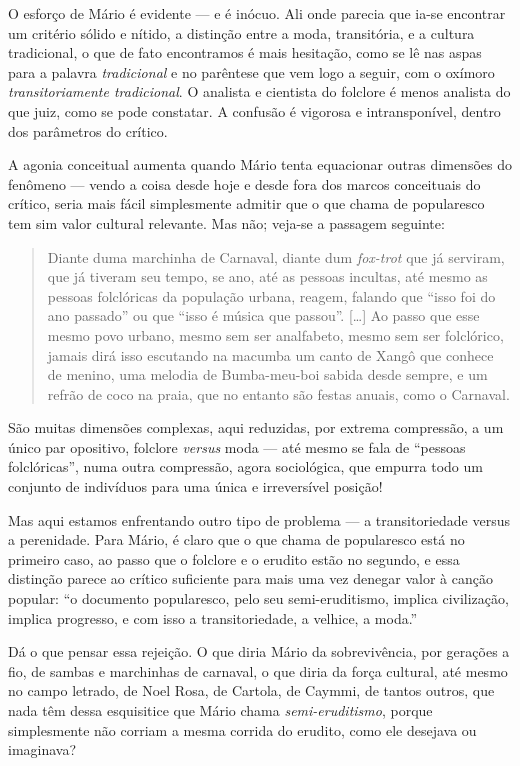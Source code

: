 O esforço de Mário é evidente --- e é inócuo. Ali onde parecia que ia-se
encontrar um critério sólido e nítido, a distinção entre a moda,
transitória, e a cultura tradicional, o que de fato encontramos é mais
hesitação, como se lê nas aspas para a palavra \textit{tradicional} e no
parêntese que vem logo a seguir, com o oxímoro \textit{transitoriamente
tradicional}. O analista e cientista do folclore é menos analista do
que juiz, como se pode constatar. A confusão é vigorosa e
intransponível, dentro dos parâmetros do crítico.

A agonia conceitual aumenta quando Mário tenta equacionar outras
dimensões do fenômeno --- vendo a coisa desde hoje e desde fora dos
marcos conceituais do crítico, seria mais fácil simplesmente admitir que
o que chama de popularesco tem sim valor cultural relevante. Mas não;
veja-se a passagem seguinte:

\begin{quote}
Diante duma marchinha de Carnaval, diante dum \textit{fox-trot} que já
serviram, que já tiveram seu tempo, se ano, até as pessoas incultas, até
mesmo as pessoas folclóricas da população urbana, reagem, falando que
``isso foi do ano passado'' ou que ``isso é música que passou''. {[}\ldots{}{]}
Ao passo que esse mesmo povo urbano, mesmo sem ser analfabeto, mesmo sem
ser folclórico, jamais dirá isso escutando na macumba um canto de Xangô
que conhece de menino, uma melodia de Bumba-meu-boi sabida desde sempre,
e um refrão de coco na praia, que no entanto são festas anuais, como o
Carnaval.
\end{quote}

São muitas dimensões complexas, aqui reduzidas, por extrema compressão,
a um único par opositivo, folclore \textit{versus} moda --- até mesmo se fala de
``pessoas folclóricas'', numa outra compressão, agora sociológica, que
empurra todo um conjunto de indivíduos para uma única e irreversível
posição!

Mas aqui estamos enfrentando outro tipo de problema --- a transitoriedade
versus a perenidade. Para Mário, é claro que o que chama de popularesco
está no primeiro caso, ao passo que o folclore e o erudito estão no
segundo, e essa distinção parece ao crítico suficiente para mais uma vez
denegar valor à canção popular: ``o documento popularesco, pelo seu
semi-eruditismo, implica civilização, implica progresso, e com isso a
transitoriedade, a velhice, a moda.''

Dá o que pensar essa rejeição. O que diria Mário da sobrevivência, por
gerações a fio, de sambas e marchinhas de carnaval, o que diria da força
cultural, até mesmo no campo letrado, de Noel Rosa, de Cartola, de
Caymmi, de tantos outros, que nada têm dessa esquisitice que Mário chama
\textit{semi-eruditismo}, porque simplesmente não corriam a mesma corrida do
erudito, como ele desejava ou imaginava?

